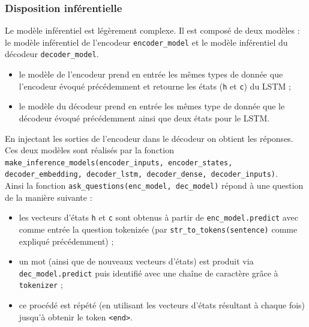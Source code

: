\documentclass[10pt,a4paper]{article}
\newcommand\tab[1][0.5cm]{\hspace*{#1}}
\begin{document}
\subsubsection{Disposition inférentielle}
Le modèle inférentiel est légèrement complexe. Il est composé de deux modèles : le modèle inférentiel de l'encodeur \texttt{encoder\_model} et le modèle inférentiel du décodeur \texttt{decoder\_model}.
\begin{itemize}
\item le modèle de l'encodeur prend en entrée les mêmes types de donnée que l'encodeur évoqué précédemment et retourne les états (\texttt{h} et \texttt{c}) du LSTM ;
\item le modèle du décodeur prend en entrée les mêmes type de donnée que le décodeur évoqué précédemment ainsi que deux états pour le LSTM. 
\end{itemize}
En injectant les sorties de l'encodeur dans le décodeur on obtient les réponses. Ces deux modèles sont réalisés par la fonction \texttt{make\_inference\_models(encoder\_inputs, encoder\_states, decoder\_embedding, decoder\_lstm, decoder\_dense, decoder\_inputs)}. \\
\tab Ainsi la fonction \texttt{ask\_questions(enc\_model, dec\_model)} répond à une question de la manière suivante :
\begin{itemize}
\item les vecteurs d'états \texttt{h} et \texttt{c} sont obtenus à partir de \texttt{enc\_model.predict} avec comme entrée la question tokenizée (par \texttt{str\_to\_tokens(sentence)} comme expliqué précédemment) ;
\item un mot (ainsi que de nouveaux vecteurs d'états) est produit via \texttt{dec\_model.predict} puis identifié avec une chaîne de caractère grâce à \texttt{tokenizer} ;
\item ce procédé est répété (en utilisant les vecteurs d'états résultant à chaque fois) jusqu'à obtenir le token \texttt{<end>}.
\end{itemize}
\end{document}
